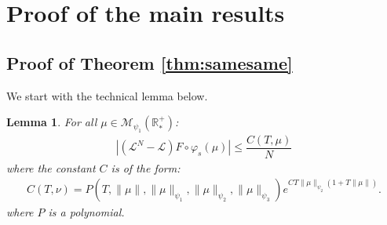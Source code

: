 \documentclass[11pt,a4paper]{article}
\newcommand{\RRP}{\mathbb{R}^+_*}
\newcommand{\MC}{\mathcal{M}}
\newcommand{\LC}{\mathcal{L}}
\newtheorem{lemma}[theorem]{Lemma}
\begin{document}
\newpage


\section{Proof of the main results}\label{Section:main-results}
\subsection{Proof of Theorem \ref{thm:samesame}}
We start with the technical lemma below.
\begin{lemma}\label{lem:bounds_diff_gen}
For all $\mu \in \MC_{\psi_1}(\RRP)$:
\begin{align*}
    \left| \left(\LC^N - \LC\right)F\circ \varphi_s (\mu) \right| \leq \dfrac{C(T,\mu)}{N}
\end{align*}
where the constant $C$ is of the form:
    \begin{align*}
        C(T,\nu) = P(T,\|\mu\|,\|\mu\|_{\psi_1},\|\mu\|_{\psi_2},\|\mu\|_{\psi_3}) e^{CT\|\mu\|_{\psi_2}(1 + T\|\mu\|)}.
    \end{align*}
    where $P$ is a polynomial.
\end{lemma}
\end{document}
